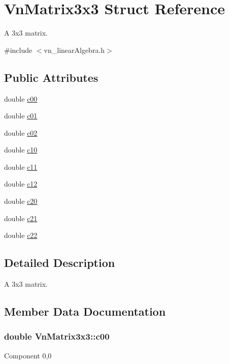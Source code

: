\hypertarget{structVnMatrix3x3}{}\section{Vn\+Matrix3x3 Struct Reference}
\label{structVnMatrix3x3}


A 3x3 matrix.  




{\ttfamily \#include $<$vn\+\_\+linear\+Algebra.\+h$>$}

\subsection*{Public Attributes}
\begin{DoxyCompactItemize}
\item 
double \hyperlink{structVnMatrix3x3_acde89da531a5a6ecc55affacba6d259c}{c00}
\item 
double \hyperlink{structVnMatrix3x3_a8fc44602ef4388cf97ee897e4247f848}{c01}
\item 
double \hyperlink{structVnMatrix3x3_aaa144d01b70e661ee1acd830542a0a36}{c02}
\item 
double \hyperlink{structVnMatrix3x3_ad9ea62284227b7faf9e0d4de35ac0ae7}{c10}
\item 
double \hyperlink{structVnMatrix3x3_a4a8bfcb11d1e4dc546979b939cdd4710}{c11}
\item 
double \hyperlink{structVnMatrix3x3_a094f0e355595700cfcceb78cd05e8ddc}{c12}
\item 
double \hyperlink{structVnMatrix3x3_ac157bda2efa69aab231a6c06443ba898}{c20}
\item 
double \hyperlink{structVnMatrix3x3_aaa5cd2e083d4d74a9daa952e9529d792}{c21}
\item 
double \hyperlink{structVnMatrix3x3_a834555c80c271a105fbe9667b5b600d2}{c22}
\end{DoxyCompactItemize}


\subsection{Detailed Description}
A 3x3 matrix. 

\subsection{Member Data Documentation}
\subsubsection[{\texorpdfstring{c00}{c00}}]{\setlength{\rightskip}{0pt plus 5cm}double Vn\+Matrix3x3\+::c00}\hypertarget{structVnMatrix3x3_acde89da531a5a6ecc55affacba6d259c}{}\label{structVnMatrix3x3_acde89da531a5a6ecc55affacba6d259c}
Component 0,0 
